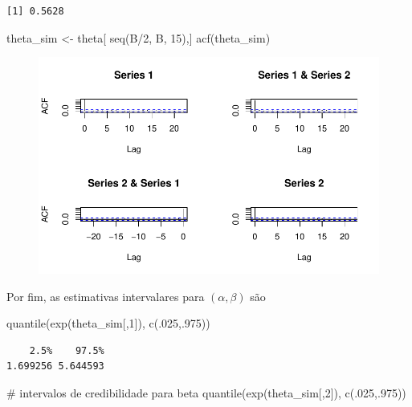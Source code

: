 \documentclass[
  letterpaper,
  DIV=11,
  numbers=noendperiod]{scrreprt}
\newenvironment{Shaded}{\begin{snugshade}}{\end{snugshade}}
\newcommand{\CommentTok}[1]{\textcolor[rgb]{0.37,0.37,0.37}{#1}}
\newcommand{\DecValTok}[1]{\textcolor[rgb]{0.68,0.00,0.00}{#1}}
\newcommand{\FunctionTok}[1]{\textcolor[rgb]{0.28,0.35,0.67}{#1}}
\newcommand{\NormalTok}[1]{\textcolor[rgb]{0.00,0.23,0.31}{#1}}
\newcommand{\OtherTok}[1]{\textcolor[rgb]{0.00,0.23,0.31}{#1}}
\newcommand{\SpecialCharTok}[1]{\textcolor[rgb]{0.37,0.37,0.37}{#1}}
\theoremstyle{definition}
\theoremstyle{definition}
\theoremstyle{remark}
\begin{document}
\begin{verbatim}
[1] 0.5628
\end{verbatim}

\begin{Shaded}
\begin{Highlighting}[]
\NormalTok{theta\_sim }\OtherTok{\textless{}{-}}\NormalTok{ theta[ }\FunctionTok{seq}\NormalTok{(B}\SpecialCharTok{/}\DecValTok{2}\NormalTok{, B, }\DecValTok{15}\NormalTok{),]}
\FunctionTok{acf}\NormalTok{(theta\_sim)}
\end{Highlighting}
\end{Shaded}

\begin{figure}[H]

{\centering \includegraphics{aproximacaoNormal_files/figure-pdf/unnamed-chunk-8-1.pdf}

}

\end{figure}

Por fim, as estimativas intervalares para \((\alpha,\beta)\) são

\begin{Shaded}
\begin{Highlighting}[]
\FunctionTok{quantile}\NormalTok{(}\FunctionTok{exp}\NormalTok{(theta\_sim[,}\DecValTok{1}\NormalTok{]), }\FunctionTok{c}\NormalTok{(.}\DecValTok{025}\NormalTok{,.}\DecValTok{975}\NormalTok{))}
\end{Highlighting}
\end{Shaded}

\begin{verbatim}
    2.5%    97.5% 
1.699256 5.644593 
\end{verbatim}

\begin{Shaded}
\begin{Highlighting}[]
\CommentTok{\# intervalos de credibilidade para beta}
\FunctionTok{quantile}\NormalTok{(}\FunctionTok{exp}\NormalTok{(theta\_sim[,}\DecValTok{2}\NormalTok{]), }\FunctionTok{c}\NormalTok{(.}\DecValTok{025}\NormalTok{,.}\DecValTok{975}\NormalTok{))}
\end{Highlighting}
\end{Shaded}
\end{document}

